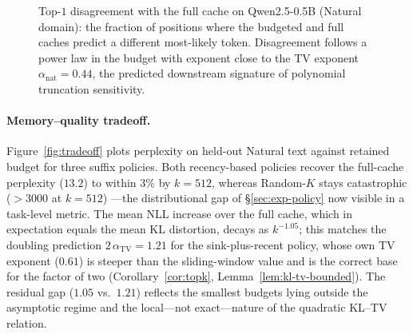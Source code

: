 \documentclass[11pt]{article}
\newcommand{\TV}{\mathrm{TV}}
\theoremstyle{plain}
\theoremstyle{definition}
\theoremstyle{remark}
\begin{document}
\begin{figure}[t]
\centering
{}
\caption{Top-$1$ disagreement with the full cache on Qwen2.5-0.5B
(Natural domain): the fraction of positions where the budgeted and full
caches predict a different most-likely token. Disagreement follows a
power law in the budget with exponent close to the TV exponent
$\alpha_{\text{nat}}=0.44$, the predicted downstream signature of
polynomial truncation sensitivity.}
\label{fig:dist}
\end{figure}

\paragraph{Memory--quality tradeoff.}
Figure~\ref{fig:tradeoff} plots perplexity on held-out Natural text
against retained budget for three suffix policies. Both recency-based
policies recover the full-cache perplexity ($13.2$) to within $3\%$ by
$k = 512$, whereas Random-$K$ stays catastrophic ($>3000$ at $k = 512$)
---the distributional gap of \S\ref{sec:exp-policy} now visible in a
task-level metric. The mean NLL increase over the full cache, which in
expectation equals the mean KL distortion, decays as $k^{-1.05}$; this
matches the doubling prediction $2\,\alpha_{\TV} = 1.21$ for the
sink-plus-recent policy, whose own TV exponent ($0.61$) is steeper than
the sliding-window value and is the correct base for the factor of two
(Corollary~\ref{cor:topk}, Lemma~\ref{lem:kl-tv-bounded}). The residual
gap ($1.05$ vs.\ $1.21$) reflects the smallest budgets lying outside the
asymptotic regime and the local---not exact---nature of the quadratic
KL--TV relation.
\end{document}
